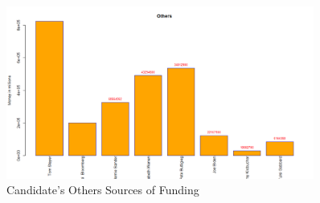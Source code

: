 \begin{figure}[H]
    \centering
    \includegraphics[width=0.9\textwidth]{figures/Others.png}
    \caption{Candidate's Others Sources of Funding}
    \label{Others}
\end{figure}
